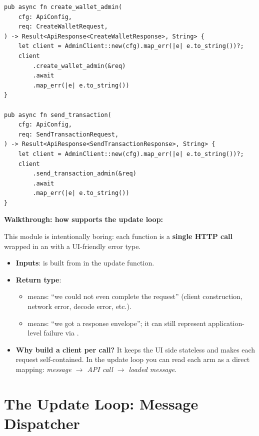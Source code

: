 \begin{listing}[H]
\begin{verbatim}
pub async fn create_wallet_admin(
    cfg: ApiConfig,
    req: CreateWalletRequest,
) -> Result<ApiResponse<CreateWalletResponse>, String> {
    let client = AdminClient::new(cfg).map_err(|e| e.to_string())?;
    client
        .create_wallet_admin(&req)
        .await
        .map_err(|e| e.to_string())
}

pub async fn send_transaction(
    cfg: ApiConfig,
    req: SendTransactionRequest,
) -> Result<ApiResponse<SendTransactionResponse>, String> {
    let client = AdminClient::new(cfg).map_err(|e| e.to_string())?;
    client
        .send_transaction_admin(&req)
        .await
        .map_err(|e| e.to_string())
}
\end{verbatim}
\end{listing}

\textbf{Walkthrough: how  supports the update loop:}

This module is intentionally boring: each function is a \textbf{single HTTP call} wrapped in an  with a UI-friendly error type.

\begin{itemize}
  \item \textbf{Inputs}:  is built from  in the update function.
  \item \textbf{Return type}: 
  \begin{itemize}
    \item {} means: ``we could not even complete the request'' (client construction, network error, decode error, etc.).
    \item {} means: ``we got a response envelope''; it can still represent application-level failure via .
  \end{itemize}
  \item \textbf{Why build a client per call?} It keeps the UI side stateless and makes each request self-contained. In the update loop you can read each  arm as a direct mapping: \emph{message \(\to\) API call \(\to\) loaded message}.
\end{itemize}

\section{The Update Loop: Message Dispatcher}
\label{sec:ch16-update}

